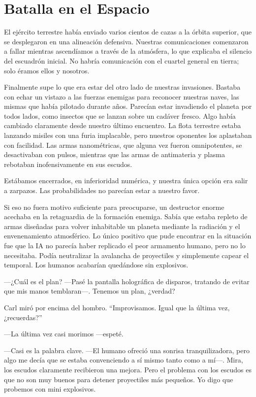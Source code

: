 \chapter{Batalla en el Espacio}\label{sec:batalla-en-el-espacio}

El ejército terrestre había enviado varios cientos de cazas a la órbita superior, que se desplegaron en una alineación defensiva. Nuestras comunicaciones comenzaron a fallar mientras ascendíamos a través de la atmósfera, lo que explicaba el silencio del escuadrón inicial. No habría comunicación con el cuartel general en tierra; solo éramos ellos y nosotros.

Finalmente supe lo que era estar del otro lado de nuestras invasiones. Bastaba con echar un vistazo a las fuerzas enemigas para reconocer nuestras naves, las mismas que había pilotado durante años. Parecían estar invadiendo el planeta por todos lados, como insectos que se lanzan sobre un cadáver fresco. Algo había cambiado claramente desde nuestro último encuentro. La flota terrestre estaba lanzando misiles con una furia implacable, pero nuestros oponentes los aplastaban con facilidad. Las armas nanométricas, que alguna vez fueron omnipotentes, se desactivaban con pulsos, mientras que las armas de antimateria y plasma rebotaban inofensivamente en sus escudos.

Estábamos encerrados, en inferioridad numérica, y nuestra única opción era salir a zarpazos. Las probabilidades no parecían estar a nuestro favor.

Si eso no fuera motivo suficiente para preocuparse, un destructor enorme acechaba en la retaguardia de la formación enemiga. Sabía que estaba repleto de armas diseñadas para volver inhabitable un planeta mediante la radiación y el envenenamiento atmosférico. Lo único positivo que pude encontrar en la situación fue que la IA no parecía haber replicado el peor armamento humano, pero no lo necesitaba. Podía neutralizar la avalancha de proyectiles y simplemente capear el temporal. Los humanos acabarían quedándose sin explosivos.

—¿Cuál es el plan? —Pasé la pantalla holográfica de disparos, tratando de evitar que mis manos temblaran—. Tenemos un plan, ¿verdad?

Carl miró por encima del hombro. ``Improvisamos. Igual que la última vez, ¿recuerdas?''

—La última vez casi morimos —espeté.

—Casi es la palabra clave. —El humano ofreció una sonrisa tranquilizadora, pero algo me decía que se estaba convenciendo a sí mismo tanto como a mí—. Mira, los escudos claramente recibieron una mejora. Pero el problema con los escudos es que no son muy buenos para detener proyectiles más pequeños. Yo digo que probemos con mini explosivos.

